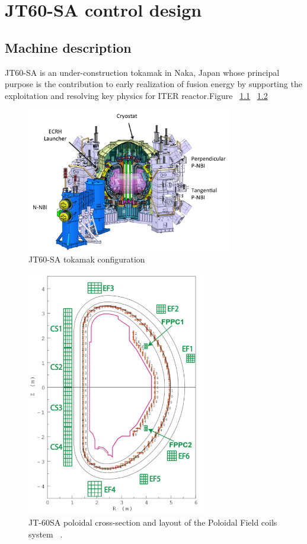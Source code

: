 \chapter{JT60-SA control design}

\section{Machine description}

JT60-SA is an under-construction tokamak in Naka, Japan whose principal purpose is  the contribution to early realization of fusion energy by supporting the exploitation and resolving key physics  for ITER reactor.Figure ~\ref{JT60schm}  ~\ref{JT60coils} 

\begin{figure}
	\centering
	\includegraphics[width=0.80\textwidth]{Chp3/JT60SA.png}
	
	\caption{\label{JT60schm}JT60-SA tokamak configuration}
\end{figure}


\begin{figure}
	\centering
	\includegraphics[width=0.7\textwidth]{Chp3/JT60Coils.png}

	\caption{	\label{JT60coils}JT-60SA poloidal cross-section and layout of the Poloidal Field coils system ~\cite{NCruz}.}
\end{figure}


